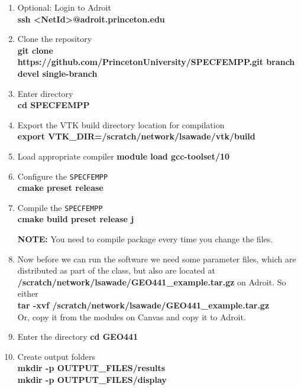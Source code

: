 \documentclass[11pt,titlepage,fleqn]{article}
\begin{document}
\begin{enumerate}

\item Optional: Login to Adroit\\
{\bf ssh <NetId>@adroit.princeton.edu}       
    
\item Clone the repository\\
      {\bf git clone https://github.com/PrincetonUniversity/SPECFEMPP.git \newline \text{-}\text{-}branch devel \text{-}\text{-}single-branch}
\item Enter directory\\
      {\bf cd SPECFEMPP}       
		
\item Export the VTK build directory location for compilation\\
      {\bf export VTK\_DIR=/scratch/network/lsawade/vtk/build}

\item Load appropriate compiler
      {\bf module load gcc-toolset/10}

\item Configure the \texttt{SPECFEMPP}\\
      {\bf cmake \text{-}\text{-}preset release}

\item Compile the \texttt{SPECFEMPP}\\
      {\bf cmake \text{-}\text{-}build \text{-}\text{-}preset release \text{-}j}

      {\bf NOTE:} You need to compile package every time you change the files.

\item Now before we can run the software we need some parameter files, which are distributed as part of the class, but also are located at {\bf /scratch/network/lsawade/GEO441\_example.tar.gz} on Adroit. So either \\
      {\bf tar -xvf /scratch/network/lsawade/GEO441\_example.tar.gz}\\
    Or, copy it from the modules on Canvas and copy it to Adroit.
      
\item Enter the directory
      {\bf cd GEO441}

\item Create output folders\\
      {\bf mkdir -p OUTPUT\_FILES/results}\\
      {\bf mkdir -p OUTPUT\_FILES/display}
      

\end{enumerate}
\end{document}
